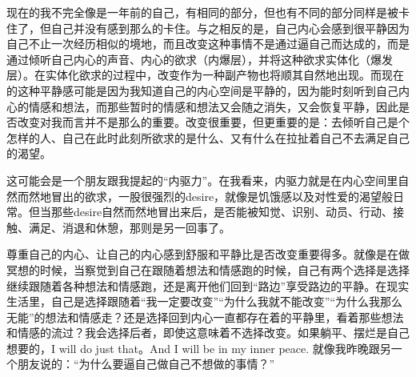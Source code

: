 现在的我不完全像是一年前的自己，有相同的部分，但也有不同的部分\pozhehao{}同样是被卡住了，但自己并没有感到那么的卡住。与之相反的是，自己内心会感到很平静\pozhehao{}因为自己不止一次经历相似的境地，而且改变这种事情不是通过逼自己而达成的，而是通过倾听自己内心的声音、内心的欲求（内爆层），并将这种欲求实体化（爆发层）。在实体化欲求的过程中，改变作为一种副产物也将顺其自然地出现。而现在的这种平静感可能是因为我知道自己的内心空间是平静的，因为能时刻听到自己内心的情感和想法，而那些暂时的情感和想法又会随之消失，又会恢复平静，因此是否改变对我而言并不是那么的重要。改变很重要，但更重要的是：去倾听自己是个怎样的人、自己在此时此刻所欲求的是什么、又有什么在拉扯着自己不去满足自己的渴望。

这可能会是一个朋友跟我提起的“内驱力”。在我看来，内驱力就是在内心空间里自然而然地冒出的欲求，一股很强烈的desire，就像是饥饿感以及对性爱的渴望般日常。但当那些desire自然而然地冒出来后，是否能被知觉、识别、动员、行动、接触、满足、消退和休憩，那则是另一回事了。

\begin{figure}
\end{figure}

尊重自己的内心、让自己的内心感到舒服和平静比是否改变重要得多。就像是在做冥想的时候，当察觉到自己在跟随着想法和情感跑的时候，自己有两个选择\pozhehao{}是选择继续跟随着各种想法和情感跑，还是离开他们回到“路边”享受路边的平静。在现实生活里，自己是选择跟随着“我一定要改变”“为什么我就不能改变”“为什么我那么无能”的想法和情感走？还是选择回到内心一直都存在着的平静里，看着那些想法和情感的流过？我会选择后者，即使这意味着不选择改变。如果躺平、摆烂是自己想要的，I will do just that。And I will be in my inner peace. 就像我昨晚跟另一个朋友说的：“为什么要逼自己做自己不想做的事情？”

